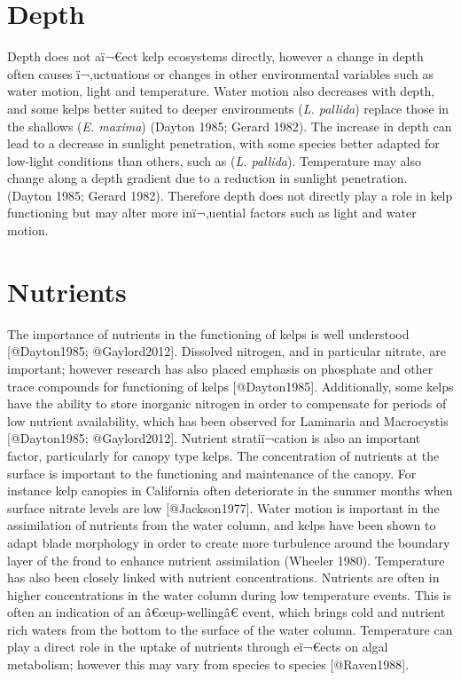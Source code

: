 \documentclass[]{article}
\newcommand{\euro}{€}
\begin{document}
\section{Depth}\label{depth}

Depth does not aï¬\euro{}ect kelp ecosystems directly, however a change
in depth often causes ï¬‚uctuations or changes in other environmental
variables such as water motion, light and temperature. Water motion also
decreases with depth, and some kelps better suited to deeper
environments (\emph{L. pallida}) replace those in the shallows (\emph{E.
maxima}) (Dayton 1985; Gerard 1982). The increase in depth can lead to a
decrease in sunlight penetration, with some species better adapted for
low-light conditions than others, such as (\emph{L. pallida}).
Temperature may also change along a depth gradient due to a reduction in
sunlight penetration. (Dayton 1985; Gerard 1982). Therefore depth does
not directly play a role in kelp functioning but may alter more
inï¬‚uential factors such as light and water motion.

\section{Nutrients}\label{nutrients}

The importance of nutrients in the functioning of kelps is well
understood {[}@Dayton1985; @Gaylord2012{]}. Dissolved nitrogen, and in
particular nitrate, are important; however research has also placed
emphasis on phosphate and other trace compounds for functioning of kelps
{[}@Dayton1985{]}. Additionally, some kelps have the ability to store
inorganic nitrogen in order to compensate for periods of low nutrient
availability, which has been observed for Laminaria and Macrocystis
{[}@Dayton1985; @Gaylord2012{]}. Nutrient stratiï¬cation is also an
important factor, particularly for canopy type kelps. The concentration
of nutrients at the surface is important to the functioning and
maintenance of the canopy. For instance kelp canopies in California
often deteriorate in the summer months when surface nitrate levels are
low {[}@Jackson1977{]}. Water motion is important in the assimilation of
nutrients from the water column, and kelps have been shown to adapt
blade morphology in order to create more turbulence around the boundary
layer of the frond to enhance nutrient assimilation (Wheeler 1980).
Temperature has also been closely linked with nutrient concentrations.
Nutrients are often in higher concentrations in the water column during
low temperature events. This is often an indication of an
â\euro{}œup-wellingâ\euro{} event, which brings cold and nutrient rich
waters from the bottom to the surface of the water column. Temperature
can play a direct role in the uptake of nutrients through eï¬\euro{}ects
on algal metabolism; however this may vary from species to species
{[}@Raven1988{]}.
\end{document}
